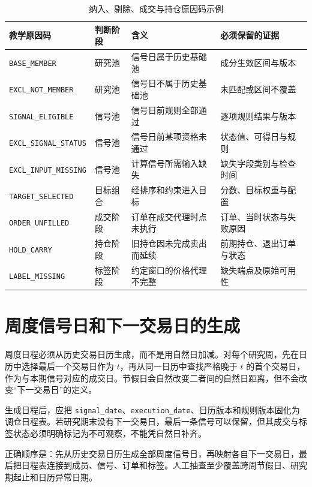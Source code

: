 \begin{table}[htbp]
  \centering
  \small
  \caption{纳入、剔除、成交与持仓原因码示例}
  \label{tab:ch03-reason-codes}
  \begin{tabularx}{\textwidth}{p{3.35cm} p{2.6cm} Y Y}
    \toprule
    教学原因码 & 判断阶段 & 含义 & 必须保留的证据 \\
    \midrule
    \texttt{BASE\_MEMBER} & 研究池 & 信号日属于历史基础池 & 成分生效区间与版本 \\
    \texttt{EXCL\_NOT\_MEMBER} & 研究池 & 信号日不属于历史基础池 & 未匹配或区间不覆盖 \\
    \texttt{SIGNAL\_ELIGIBLE} & 信号池 & 信号日前规则全部通过 & 逐项规则结果与版本 \\
    \texttt{EXCL\_SIGNAL\_STATUS} & 信号池 & 信号日前某项资格未通过 & 状态值、可得日与规则 \\
    \texttt{EXCL\_INPUT\_MISSING} & 信号池 & 计算信号所需输入缺失 & 缺失字段类别与检查时间 \\
    \texttt{TARGET\_SELECTED} & 目标组合 & 经排序和约束进入目标 & 分数、目标权重与配置 \\
    \texttt{ORDER\_UNFILLED} & 成交阶段 & 订单在成交代理时点未执行 & 订单、当时状态与失败原因 \\
    \texttt{HOLD\_CARRY} & 持仓阶段 & 旧持仓因未完成卖出而延续 & 前期持仓、退出订单与状态 \\
    \texttt{LABEL\_MISSING} & 标签阶段 & 约定窗口的价格代理不完整 & 缺失端点及原始可用性 \\
    \bottomrule
  \end{tabularx}
\end{table}

\section{周度信号日和下一交易日的生成}

周度日程必须从历史交易日历生成，而不是用自然日加减。对每个研究周，先在日历中选择最后一个交易日作为 \(t\)，再从同一日历中查找严格晚于 \(t\) 的首个交易日，作为与本期信号对应的成交日。节假日会自然改变二者间的自然日距离，但不会改变“下一交易日”的定义。

生成日程后，应把 \texttt{signal\_date}、\texttt{execution\_date}、日历版本和规则版本固化为调仓日程表。若研究期末没有下一交易日，最后一条信号可以保留，但其成交与标签状态必须明确标记为不可观察，不能凭自然日补齐。

\begin{practicebox}
正确顺序是：先从历史交易日历生成全部周度信号日，再映射各自下一交易日，最后把日程表连接到成员、信号、订单和标签。人工抽查至少覆盖跨周节假日、研究期起止和日历异常日期。
\end{practicebox}

